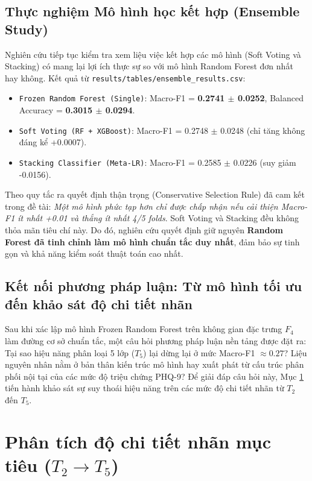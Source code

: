\subsection{Thực nghiệm Mô hình học kết hợp (Ensemble Study)}
Nghiên cứu tiếp tục kiểm tra xem liệu việc kết hợp các mô hình (Soft Voting và Stacking) có mang lại lợi ích thực sự so với mô hình Random Forest đơn nhất hay không. Kết quả từ \texttt{results/tables/ensemble\_results.csv}:
\begin{itemize}
    \item \texttt{Frozen Random Forest (Single)}: Macro-F1 = \textbf{0.2741 $\pm$ 0.0252}, Balanced Accuracy = \textbf{0.3015 $\pm$ 0.0294}.
    \item \texttt{Soft Voting (RF + XGBoost)}: Macro-F1 = 0.2748 $\pm$ 0.0248 (chỉ tăng không đáng kể +0.0007).
    \item \texttt{Stacking Classifier (Meta-LR)}: Macro-F1 = 0.2585 $\pm$ 0.0226 (suy giảm -0.0156).
\end{itemize}

Theo quy tắc ra quyết định thận trọng (Conservative Selection Rule) đã cam kết trong đề tài: \textit{Một mô hình phức tạp hơn chỉ được chấp nhận nếu cải thiện Macro-F1 ít nhất +0.01 và thắng ít nhất 4/5 folds}. Soft Voting và Stacking đều không thỏa mãn tiêu chí này. Do đó, nghiên cứu quyết định giữ nguyên \textbf{Random Forest đã tinh chỉnh làm mô hình chuẩn tắc duy nhất}, đảm bảo sự tinh gọn và khả năng kiểm soát thuật toán cao nhất.

\subsection{Kết nối phương pháp luận: Từ mô hình tối ưu đến khảo sát độ chi tiết nhãn}
Sau khi xác lập mô hình Frozen Random Forest trên không gian đặc trưng $F_4$ làm đường cơ sở chuẩn tắc, một câu hỏi phương pháp luận nền tảng được đặt ra: Tại sao hiệu năng phân loại 5 lớp ($T_5$) lại dừng lại ở mức Macro-F1 $\approx 0.27$? Liệu nguyên nhân nằm ở bản thân kiến trúc mô hình hay xuất phát từ cấu trúc phân phối nội tại của các mức độ triệu chứng PHQ-9? Để giải đáp câu hỏi này, Mục \ref{sec:target-granularity} tiến hành khảo sát sự suy thoái hiệu năng trên các mức độ chi tiết nhãn từ $T_2$ đến $T_5$.

\FloatBarrier
\section{Phân tích độ chi tiết nhãn mục tiêu ($T_2 \to T_5$)}
\label{sec:target-granularity}

